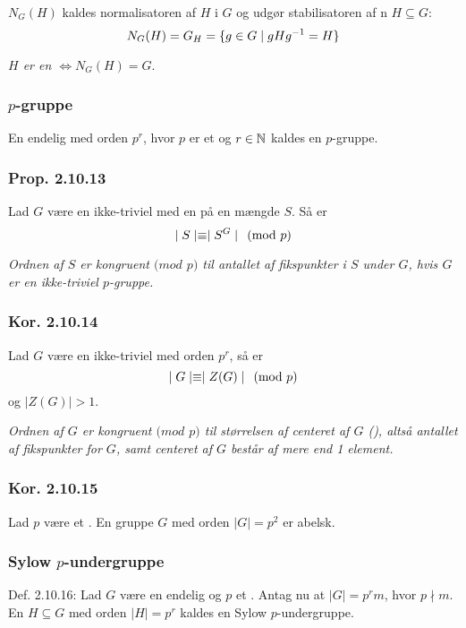 $N_G(H)$ kaldes normalisatoren af $H$ i $G$ og udgør stabilisatoren af
n $H \subseteq G$:
\begin{equation*}
  N_G(H) = G_H = \{ g \in G \mid gHg^{-1} = H \}
\end{equation*}

\textit{$H$ er en  $\iff N_G(H) = G$}.

\subsubsection{$p$-gruppe}
\label{p-gruppe}
En endelig  med orden $p^r$, hvor $p$ er et  og
$r \in \mathbb{N}$ kaldes en $p$-gruppe.

\subsubsection{Prop. 2.10.13}
Lad $G$ være en ikke-triviel  med en 
på en mængde $S$. Så er
\begin{equation*}
  \mid S\mid \equiv \mid S^G\mid \pmod{p}
\end{equation*}

\textit{Ordnen af $S$ er kongruent $(mod$  $p)$ til antallet af fikspunkter i
$S$ under $G$, hvis $G$ er en ikke-triviel $p$-gruppe.}

\subsubsection{Kor. 2.10.14}
Lad $G$ være en ikke-triviel  med orden $p^r$, så er
\begin{equation*}
  \mid G\mid \equiv \mid Z(G)\mid \pmod{p}
\end{equation*}
og $\mid Z(G)\mid > 1$.

\textit{Ordnen af $G$ er kongruent $(mod$  $p)$ til størrelsen af centeret af
$G$ (), altså antallet af fikspunkter for $G$, samt
centeret af $G$ består af mere end 1 element.}

\subsubsection{Kor. 2.10.15}
Lad $p$ være et . En gruppe $G$ med orden $\mid G\mid = p^2$ er
abelsk.

\subsubsection{Sylow $p$-undergruppe}
\label{Sylow p-undergruppe}
Def. 2.10.16: Lad $G$ være en endelig  og $p$ et
. Antag nu at $\mid G\mid = p^r m$, hvor $p \nmid m$. En
 $H \subseteq G$ med orden $\mid H\mid = p^r$ kaldes en
Sylow $p$-undergruppe.

